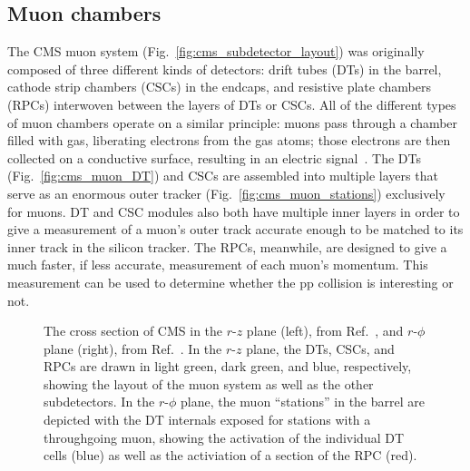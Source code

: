 \subsection{Muon chambers}
The CMS muon system (Fig.~\ref{fig:cms_subdetector_layout}) was originally composed of three different kinds of detectors: drift tubes (DTs) in the barrel, cathode strip chambers (CSCs) in the endcaps, and resistive plate chambers (RPCs) interwoven between the layers of DTs or CSCs. 
All of the different types of muon chambers operate on a similar principle: muons pass through a chamber filled with gas, liberating electrons from the gas atoms; those electrons are then collected on a conductive surface, resulting in an electric signal~\cite{CERN-LHCC-97-032}. 
The DTs (Fig.~\ref{fig:cms_muon_DT}) and CSCs are assembled into multiple layers that serve as an enormous outer tracker (Fig.~\ref{fig:cms_muon_stations}) exclusively for muons. 
DT and CSC modules also both have multiple inner layers in order to give a measurement of a muon's outer track accurate enough to be matched to its inner track in the silicon tracker. 
The RPCs, meanwhile, are designed to give a much faster, if less accurate, measurement of each muon's momentum. 
This measurement can be used to determine whether the pp collision is interesting or not.

\begin{figure}[htb]
    \centering
    \quad
    \caption{
        The cross section of CMS in the $r$-$z$ plane (left), from Ref.~\cite{CMS:2018rym}, and $r$-$\phi$ plane (right), from Ref.~\cite{CMSWebMuons}. 
        In the $r$-$z$ plane, the DTs, CSCs, and RPCs are drawn in light green, dark green, and blue, respectively, showing the layout of the muon system as well as the other subdetectors. 
        In the $r$-$\phi$ plane, the muon ``stations'' in the barrel are depicted with the DT internals exposed for stations with a throughgoing muon, showing the activation of the individual DT cells (blue) as well as the activiation of a section of the RPC (red).
    }
\end{figure}

